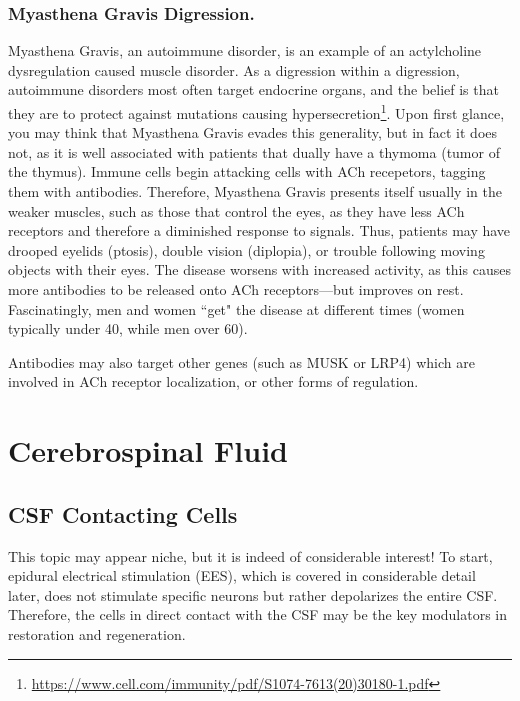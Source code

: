 \documentclass[12pt]{report}
\begin{document}
\subsubsection{Myasthena Gravis Digression.}
Myasthena Gravis, an autoimmune disorder, is an example of an actylcholine dysregulation caused muscle disorder. As a digression within a digression, autoimmune disorders most often target endocrine organs, and the belief is that they are to protect against mutations causing hypersecretion\footnote{\url{https://www.cell.com/immunity/pdf/S1074-7613(20)30180-1.pdf}}. Upon first glance, you may think that Myasthena Gravis evades this generality, but in fact it does not, as it is well associated with patients that dually have a thymoma (tumor of the thymus). Immune cells begin attacking cells with ACh recepetors, tagging them with antibodies. Therefore, Myasthena Gravis presents itself usually in the weaker muscles, such as those that control the eyes, as they have less ACh receptors and therefore a diminished response to signals. Thus, patients may have drooped eyelids (ptosis), double vision (diplopia), or trouble following moving objects with their eyes. The disease worsens with increased activity, as this causes more antibodies to be released onto ACh receptors---but improves on rest. Fascinatingly, men and women ``get" the disease at different times (women typically under 40, while men over 60).\newline

Antibodies may also target other genes (such as MUSK or LRP4) which are involved in ACh receptor localization, or other forms of regulation.


\section{Cerebrospinal Fluid}

\subsection{CSF Contacting Cells}

This topic may appear niche, but it is indeed of considerable interest! To start, epidural electrical stimulation (EES), which is covered in considerable detail later, does not stimulate specific neurons but rather depolarizes the entire CSF. Therefore, the cells in direct contact with the CSF may be the key modulators in restoration and regeneration.\newline
\end{document}
